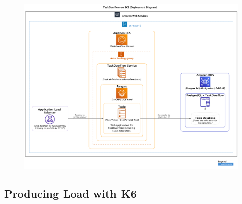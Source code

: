 \documentclass{csse4400}
\begin{document}




\begin{figure}[H]
  \includegraphics[width=\textwidth]{diagrams/ecsdeployment}
\end{figure}

\subsection{Producing Load with K6}




\end{document}

